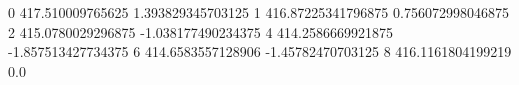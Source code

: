 0 417.510009765625 1.393829345703125
1 416.87225341796875 0.756072998046875
2 415.0780029296875 -1.038177490234375
4 414.2586669921875 -1.857513427734375
6 414.6583557128906 -1.45782470703125
8 416.1161804199219 0.0
